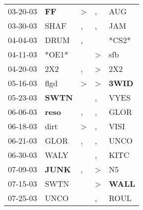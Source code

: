 \begin{supertabular}{p{0.07\textwidth}p{0.06\textwidth}p{0.02\textwidth}p{0.02\textwidth}p{0.06\textwidth}}
          03-20-03\textsuperscript{} &    \textbf{FF\textsuperscript{}} &     \textgreater &                , &            AUG\textsuperscript{} \\
          03-30-03\textsuperscript{} &           SHAF\textsuperscript{} &                , &                , &            JAM\textsuperscript{} \\
          04-04-03\textsuperscript{} &           DRUM\textsuperscript{} &                , &                  &                            *CS2* \\
          04-11-03\textsuperscript{} &                            *OE1* &                  &     \textgreater &            sfb\textsuperscript{} \\
          04-20-03\textsuperscript{} &            2X2\textsuperscript{} &                , &     \textgreater &            2X2\textsuperscript{} \\
          05-16-03\textsuperscript{} &           flgd\textsuperscript{} &     \textgreater &     \textgreater &  \textbf{3WID\textsuperscript{}} \\
          05-23-03\textsuperscript{} &  \textbf{SWTN\textsuperscript{}} &                  &                , &           VYES\textsuperscript{} \\
          06-06-03\textsuperscript{} &  \textbf{reso\textsuperscript{}} &                , &                , &           GLOR\textsuperscript{} \\
          06-18-03\textsuperscript{} &           dirt\textsuperscript{} &     \textgreater &                , &           VISI\textsuperscript{} \\
          06-21-03\textsuperscript{} &           GLOR\textsuperscript{} &                , &                , &           UNCO\textsuperscript{} \\
          06-30-03\textsuperscript{} &           WALY\textsuperscript{} &                  &                , &           KITC\textsuperscript{} \\
          07-09-03\textsuperscript{} &  \textbf{JUNK\textsuperscript{}} &                , &     \textgreater &             N5\textsuperscript{} \\
          07-15-03\textsuperscript{} &           SWTN\textsuperscript{} &                  &     \textgreater &  \textbf{WALL\textsuperscript{}} \\
          07-25-03\textsuperscript{} &           UNCO\textsuperscript{} &                  &                , &           ROUL\textsuperscript{} \\

\end{supertabular}
